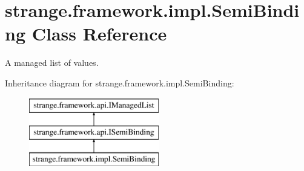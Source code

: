 \hypertarget{classstrange_1_1framework_1_1impl_1_1_semi_binding}{\section{strange.\-framework.\-impl.\-Semi\-Binding Class Reference}
\label{classstrange_1_1framework_1_1impl_1_1_semi_binding}
}


A managed list of values.  


Inheritance diagram for strange.\-framework.\-impl.\-Semi\-Binding\-:\begin{figure}[H]
\begin{center}
\leavevmode
\includegraphics[height=3.000000cm]{classstrange_1_1framework_1_1impl_1_1_semi_binding}
\end{center}
\end{figure}
